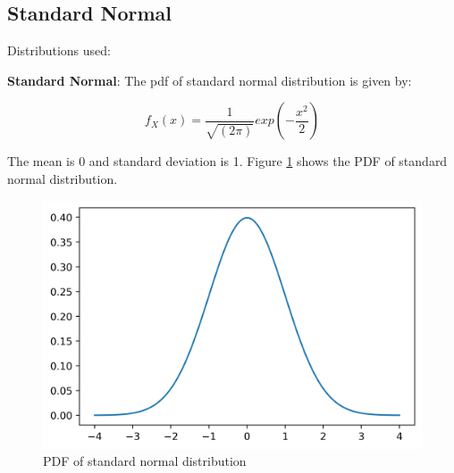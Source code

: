 \documentclass[10pt]{beamer}
\begin{document}
\subsection{Standard Normal}
\begin{frame}{}
Distributions used:

    \textbf{Standard Normal}: The pdf of standard normal distribution is given by:
    \begin{block}{}
    $$f_X(x) = \dfrac{1}{\sqrt{(2\pi)}}exp\left(-\dfrac{x^2}{2}\right)$$
    \end{block}
    The mean is 0 and standard deviation is 1. Figure \ref{normal_pdf} shows the PDF of standard normal distribution.
\end{frame}
\begin{frame}{}
        \begin{figure}[H]
        \centering
        \includegraphics[scale=0.5]{images/gaussian.png}
        \caption{PDF of standard normal distribution}
        \label{normal_pdf}
    \end{figure}
\end{frame}
\end{document}
